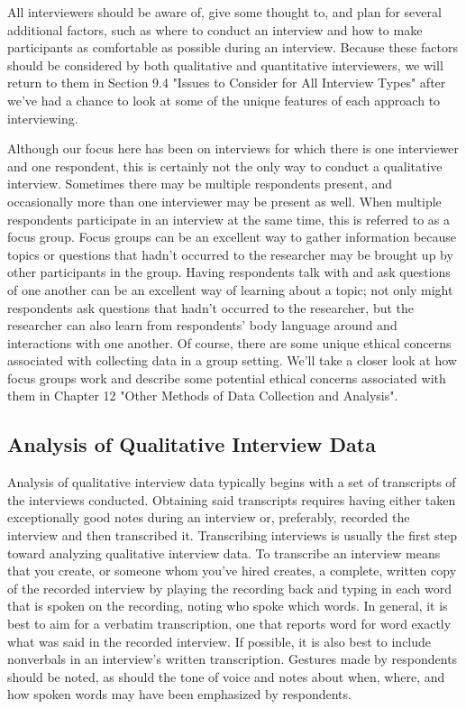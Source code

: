 All interviewers should be aware of, give some thought to, and plan for several additional factors, such as where to conduct an interview and how to make participants as comfortable as possible during an interview. Because these factors should be considered by both qualitative and quantitative interviewers, we will return to them in Section 9.4 "Issues to Consider for All Interview Types" after we’ve had a chance to look at some of the unique features of each approach to interviewing.

Although our focus here has been on interviews for which there is one interviewer and one respondent, this is certainly not the only way to conduct a qualitative interview. Sometimes there may be multiple respondents present, and occasionally more than one interviewer may be present as well. When multiple respondents participate in an interview at the same time, this is referred to as a focus group. Focus groups can be an excellent way to gather information because topics or questions that hadn’t occurred to the researcher may be brought up by other participants in the group. Having respondents talk with and ask questions of one another can be an excellent way of learning about a topic; not only might respondents ask questions that hadn’t occurred to the researcher, but the researcher can also learn from respondents’ body language around and interactions with one another. Of course, there are some unique ethical concerns associated with collecting data in a group setting. We’ll take a closer look at how focus groups work and describe some potential ethical concerns associated with them in Chapter 12 "Other Methods of Data Collection and Analysis".

\subsection{Analysis of Qualitative Interview Data}

Analysis of qualitative interview data typically begins with a set of transcripts of the interviews conducted. Obtaining said transcripts requires having either taken exceptionally good notes during an interview or, preferably, recorded the interview and then transcribed it. Transcribing interviews is usually the first step toward analyzing qualitative interview data. To transcribe an interview means that you create, or someone whom you’ve hired creates, a complete, written copy of the recorded interview by playing the recording back and typing in each word that is spoken on the recording, noting who spoke which words. In general, it is best to aim for a verbatim transcription, one that reports word for word exactly what was said in the recorded interview. If possible, it is also best to include nonverbals in an interview’s written transcription. Gestures made by respondents should be noted, as should the tone of voice and notes about when, where, and how spoken words may have been emphasized by respondents.

